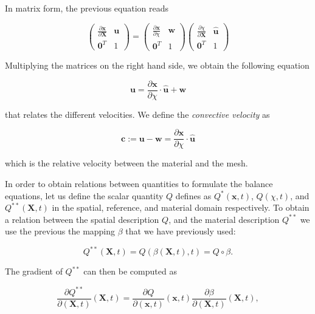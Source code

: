 \documentclass[a4paper,11pt,openright,twoside]{book}
\begin{document}
In matrix form, the previous equation reads

\begin{equation}
\begin{pmatrix}
\frac{\partial \mathbf{x}}{\partial \mathbf{X}} & \mathbf{u}\\
\mathbf{0}^T & 1
\end{pmatrix} = 
\begin{pmatrix}
\frac{\partial \mathbf{x}}{\partial \chi} & \mathbf{w}\\
\mathbf{0}^T & 1
\end{pmatrix}
\begin{pmatrix}
\frac{\partial \chi}{\partial \mathbf{X}} & \hat{\mathbf{u}}\\
\mathbf{0}^T & 1
\end{pmatrix}
\end{equation}

Multiplying the matrices on the right hand side, we obtain the following equation

\begin{equation}
\mathbf{u} = \frac{\partial \mathbf{x}}{\partial \chi} \cdot \hat{\mathbf{u}} + \mathbf{w}
\end{equation}

that relates the different velocities. We define the \emph{convective velocity} as

\begin{equation}
\mathbf{c} := \mathbf{u} -\mathbf{w} = \frac{\partial \mathbf{x}}{\partial \chi} \cdot \hat{\mathbf{u}}
\end{equation}

which is the relative velocity between the material and the mesh.

In order to obtain relations between quantities to formulate the balance equations, let us define the scalar quantity $Q$ defines as $Q^{*}(\mathbf{x},t)$, $Q(\chi,t)$, and $Q^{**}(\mathbf{X},t)$ in the spatial, reference, and material domain respectively.
To obtain a relation between the spatial description $Q$, and the material description $Q^{**}$ we use the previous the mapping $\beta$ that we have previously used:

\begin{equation}
Q^{**}(\mathbf{X},t) = Q(\beta(\mathbf{X},t),t) = Q \circ \beta.
\end{equation}

The gradient of $Q^{**}$ can then be computed as

\begin{equation}
\label{eq:ale:1}
\frac{\partial Q^{**}}{\partial (\mathbf{X}, t)} (\mathbf{X},t) = 
\frac{\partial Q}{\partial (\mathbf{x}, t)} (\mathbf{x},t)
\frac{\partial \beta}{\partial (\mathbf{X}, t)} (\mathbf{X},t),
\end{equation}
\end{document}
